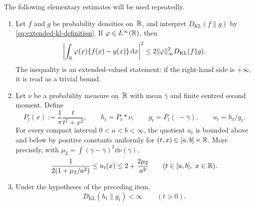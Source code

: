 \begin{lemma}%
\label{lem:kl-bounded-test-and-poisson-quotient}
\label{lem:bounded-test-pinsker}
\label{lem:finite-time-poisson-kl-finite}
\label{lem:sharp-threshold-bounded-test-pinsker}
The following elementary estimates will be used repeatedly.

\begin{enumerate}
\item Let \(f\) and \(g\) be probability densities on~\(\mathbb{R}\), and interpret
\(D_{\mathrm{KL}}(f\|g)\) by \eqref{eq:extended-kl-definition}.  If
\(\varphi\in L^\infty(\mathbb{R})\), then
\begin{equation}\label{eq:prelim-bounded-test-pinsker}
\left|\int_{\mathbb{R}}\varphi(x)\{f(x)-g(x)\}\,\mathrm{d} x\right|^2
\le 2\|\varphi\|_\infty^2D_{\mathrm{KL}}(f\|g).
\end{equation}
The inequality is an extended-valued statement: if the right-hand side is
\(+\infty\), it is read as a trivial bound.

\item Let \(\nu\) be a probability measure on~\(\mathbb{R}\) with mean
\(\bar{\gamma}\) and finite centred second moment.  Define
\[
P_t(x):=\frac{1}{\pi}\frac{t}{t^2+x^2},\qquad
h_t=P_t*\nu,\qquad g_t=P_t(\cdot-\bar{\gamma}),\qquad u_t=h_t/g_t .
\]
For every compact interval \(0<a<b<\infty\), the quotient \(u_t\) is bounded
above and below by positive constants uniformly for
\((t,x)\in[a,b]\times\mathbb{R}\).  More precisely, with
\(\mu_2=\int(\gamma-\bar\gamma)^2\dd\nu(\gamma)\),
\begin{equation}\label{eq:prelim-poisson-quotient-two-sided-bound}
\frac{1}{2(1+\mu_2/a^2)}
\le u_t(x)\le 2+\frac{2\mu_2}{a^2}
\qquad(t\in[a,b],\ x\in\mathbb{R}).
\end{equation}

\item Under the hypotheses of the preceding item,
\[
D_{\mathrm{KL}}(h_t\|g_t)<\infty\qquad(t>0).
\]
\end{enumerate}
\end{lemma}

